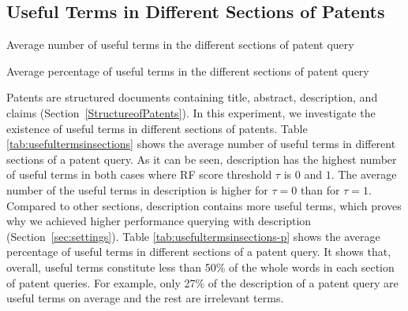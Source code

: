 \subsection{Useful Terms in Different Sections of Patents}
\begin{table}[t!]
  \begin{center}
   \caption{Average number of useful terms in the different sections of patent query}
     
  \label{tab:usefultermsinsections}
  \end{center}  
\end{table}
\begin{table}[t!]
  \begin{center}
   \caption{Average percentage of useful terms in the different sections of patent query}
     
  \label{tab:usefultermsinsections-p}
  \end{center}  
\end{table}
Patents are structured documents containing title, abstract, description, and claims (Section~\ref{StructureofPatents}). In this experiment, we investigate the existence of useful terms in different sections of patents. 
Table \ref{tab:usefultermsinsections} shows the average number of useful terms in different sections of a patent query.  
As it can be seen, description has the highest number of useful terms in both cases where RF score threshold $ \tau $ is $0$ and $1$. 
The average number of the useful terms in description is higher for $ \tau = 0 $ than for $ \tau = 1 $.
Compared to other sections, description contains more useful terms, which proves why we achieved higher performance querying with description (Section~\ref{sec:settings}).
Table \ref{tab:usefultermsinsections-p} shows the average percentage of useful terms in different sections of a patent query. It shows that, overall, useful terms constitute less than 50\% of the whole words in each section of patent queries. For example, only 27\% of the description of a patent query are useful terms on average and the rest are irrelevant terms. 
